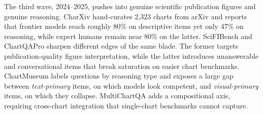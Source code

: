 The third wave, 2024--2025, pushes into genuine scientific
publication figures and genuine reasoning. CharXiv
\citep{wang2024charxiv} hand-curates 2{,}323 charts from arXiv and
reports that frontier models reach roughly 80\% on descriptive items
yet only 47\% on reasoning, while expert humans remain near 80\% on
the latter. SciFIBench \citep{huang2024scifibench} and ChartQAPro
\citep{masry2025chartqapro} sharpen different edges of the same
blade. The former targets publication-quality figure interpretation,
while the latter introduces unanswerable and conversational items
that break saturation on easier chart benchmarks. ChartMuseum
\citep{tang2025chartmuseum} labels questions by reasoning type and
exposes a large gap between \emph{text-primary} items, on which
models look competent, and \emph{visual-primary} items, on which
they collapse. MultiChartQA \citep{zhu2024multichartqa} adds a
compositional axis, requiring cross-chart integration that
single-chart benchmarks cannot capture.

